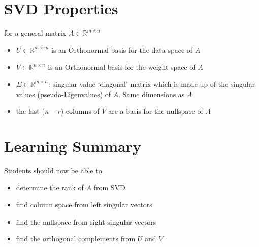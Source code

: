 \documentclass[12pt]{book}
\begin{document}
\section*{SVD Properties}
for a general matrix $A\in \mathbb{R}^{m\times n}$
\begin{itemize}
        \item $U\in\mathbb{R}^{m\times m}$ is an Orthonormal basis for the data space of $A$ 
        \item $V\in \mathbb{R}^{n\times n}$ is an Orthonormal basis for the weight space of $A$
        \item  $\Sigma\in\mathbb{R}^{m\times n}$: singular value `diagonal' matrix which is 
                made up of the singular values (pseudo-Eigenvalues)
                of $A$. Same dimensions as  $A$
        \item the last ($n-r$) columns of  $V$ are a basis for the nullspace of  $A$
\end{itemize}

\section*{Learning Summary}
Students should now be able to
\begin{itemize}
        \item  determine the rank of $A$ from SVD
        \item find column space from left singular vectors
        \item find the nullspace from right singular vectors
        \item find the orthogonal complements from  $U$ and  $V$
\end{itemize}
\end{document}
